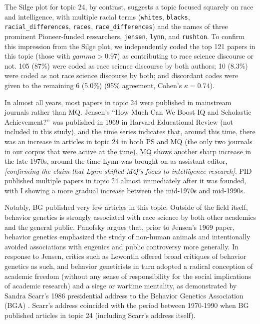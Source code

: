 \documentclass[12pt]{article}
\begin{document}
The Silge plot for topic 24, by contrast, suggests a topic focused
squarely on race and intelligence, with multiple racial terms
(\texttt{whites}, \texttt{blacks}, \texttt{racial\_differences},
\texttt{races}, \texttt{race\_differences}) and the names of three
prominent Pioneer-funded researchers, \texttt{jensen}, \texttt{lynn},
and \texttt{rushton}. To confirm this impression from the Silge plot, we
independently coded the top 121 papers in this topic (those with
\(gamma > 0.97\)) as contributing to race science discourse or not. 105
(87\%) were coded as race science discourse by both authors; 10 (8.3\%)
were coded as not race science discourse by both; and discordant codes
were given to the remaining 6 (5.0\%) (95\% agreement, Cohen's
\(\kappa = 0.74\)).

In almost all years, most papers in topic 24 were published in
mainstream journals rather than MQ. Jensen's ``How Much Can We Boost IQ
and Scholastic Achievement?'' \cite{JensenHowMuchCan1969} was published
in 1969 in Harvard Educational Review (not included in this study), and
the time series indicates that, around this time, there was an increase
in articles in topic 24 in both PS and MQ (the only two journals in our
corpus that were active at the time). MQ shows another sharp increase in
the late 1970s, around the time Lynn was brought on as assistant editor,
\emph{{[}confirming the claim that Lynn shifted MQ's focus to
intelligence research{]}}. PID published multiple papers in topic 24
almost immediately after it was founded, with I showing a more gradual
increase between the mid-1970s and mid-1990s.

Notably, BG published very few articles in this topic. Outside of the
field itself, behavior genetics is strongly associated with race science
by both other academics and the general public. Panofsky
\cite{PanofskyMisbehavingScienceControversy2014} argues that, prior to
Jensen's 1969 paper, behavior genetics emphasized the study of non-human
animals and intentionally avoided associations with eugenics and public
controversy more generally. In response to Jensen, critics such as
Lewontin offered broad critiques of behavior genetics as such, and
behavior geneticists in turn adopted a radical conception of academic
freedom (without any sense of responsibility for the social implications
of academic research) and a siege or wartime mentality, as demonstrated
by Sandra Scarr's 1986 presidential address to the Behavior Genetics
Association (BGA) \cite{ScarrThreeCheersBehavior1987}. Scarr's address
coincided with the period between 1970-1990 when BG published articles
in topic 24 (including Scarr's address itself).
\end{document}
